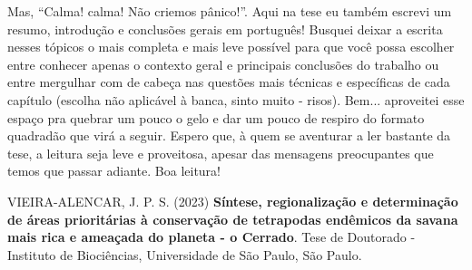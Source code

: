 \documentclass[12pt,openright,oneside,a4paper,english]{abntex2}
\begin{document}
Mas, “Calma! calma! Não criemos pânico!”. Aqui na tese eu também escrevi um resumo, introdução e conclusões gerais em português! Busquei deixar a escrita nesses tópicos o mais completa e mais leve possível para que você possa escolher entre conhecer apenas o contexto geral e principais conclusões do trabalho ou entre mergulhar com de cabeça nas questões mais técnicas e específicas de cada capítulo (escolha não aplicável à banca, sinto muito - risos). Bem... aproveitei esse espaço pra quebrar um pouco o gelo e dar um pouco de respiro do formato quadradão que virá a seguir. Espero que, à quem se aventurar a ler bastante da tese, a leitura seja leve e proveitosa, apesar das mensagens preocupantes que temos que passar adiante. Boa leitura!

\pagebreak


\begin{resumo}[Resumo]
	VIEIRA-ALENCAR, J. P. S. (2023) \textbf{Síntese, regionalização e determinação de áreas prioritárias à conservação de tetrapodas endêmicos da savana mais rica e ameaçada do planeta - o Cerrado}. Tese de Doutorado - Instituto de Biociências, Universidade de São Paulo, São Paulo.\\
	

\end{resumo}
\end{document}
